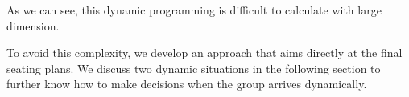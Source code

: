 As we can see, this dynamic programming is difficult to calculate with large dimension. 


To avoid this complexity, we develop an approach that aims directly at the final seating plans. We discuss two dynamic situations in the following section to further know how to make decisions when the group arrives dynamically.




